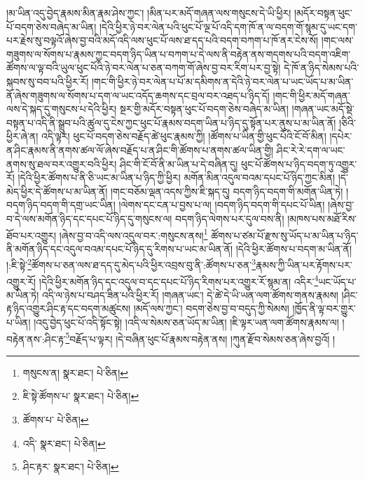 །མ་ཡིན་འདུ་བྱེད་རྣམས་མིན་རྣམ་ཤེས་ཀྱང་། །མིན་པར་མདོ་གཞན་ལས་གསུངས་དེ་ཡི་ཕྱིར། །མདོར་བསྟན་ཕུང་པོ་བདག་ཅེས་བཞེད་མ་ཡིན། །དེའི་ཕྱིར་ཉེ་བར་ལེན་པའི་ཕུང་པོ་ལྔ་པོ་འདི་དག་ཁོ་ན་ལ་བདག་གོ་སྙམ་དུ་ཡང་དག་པར་རྗེས་སུ་བལྟའོ་ཞེས་བྱ་བའི་མདོ་འདི་ལས་ཕུང་པོ་ལས་ཐ་དད་པའི་བདག་བཀག་པ་ཁོ་ནར་ངེས་སོ། །གང་ལས་གཟུགས་ལ་སོགས་པ་རྣམས་ཀྱང་བདག་ཉིད་ཡིན་པ་བཀག་པ་དེ་ལས་ནི་བརྟེན་ནས་གདགས་པའི་བདག་འཇིག་ཚོགས་ལ་ལྟ་བའི་ཡུལ་ཕུང་པོའི་ཉེ་བར་ལེན་པ་ཅན་བཀག་གོ་ཞེས་བྱ་བར་རིག་པར་བྱ་སྟེ། དེ་ཁོ་ན་ཉིད་སེམས་པའི་སྐབས་སུ་བབ་པའི་ཕྱིར་རོ། །གང་གི་ཕྱིར་ཉེ་བར་ལེན་པ་པོ་མ་དམིགས་ན་དེའི་ཉེ་བར་ལེན་པ་ཡང་ཡོད་པ་མ་ཡིན་ནོ་ཞེས་གཟུགས་ལ་སོགས་པ་དག་ལ་ཡང་འདོད་ཆགས་དང་བྲལ་བར་འཐད་པ་ཉིད་དོ། །གང་གི་ཕྱིར་མདོ་གཞན་ལས་དེ་སྐད་དུ་གསུངས་པ་དེའི་ཕྱིར། སྔར་གྱི་མདོར་བསྟན་ཕུང་པོ་བདག་ཅེས་བཞེད་མ་ཡིན། །གཞན་ཡང་མདོ་སྡེ་བསྟན་པ་འདི་ནི་སྒྲུབ་པའི་ཚུལ་དུ་ངེས་ཀྱང་ཕུང་པོ་རྣམས་བདག་ཡིན་པ་ཉིད་དུ་སྟོན་པར་ནུས་པ་མ་ཡིན་ནོ། །ཅིའི་ཕྱིར་ཞེ་ན། འདི་ལྟར། ཕུང་པོ་བདག་ཅེས་བརྗོད་ཚེ་ཕུང་རྣམས་ཀྱི། །ཚོགས་པ་ཡིན་གྱི་ཕུང་པོའི་ངོ་བོ་མིན། །དཔེར་ན་ཤིང་རྣམས་ནི་ནགས་ཚལ་ལོ་ཞེས་བརྗོད་པ་ན་ཤིང་གི་ཚོགས་པ་ནགས་ཚལ་ཡིན་གྱི། ཤིང་རེ་རེ་དག་ལ་ཡང་ནགས་སུ་ཐལ་བར་འགྱུར་བའི་ཕྱིར། ཤིང་གི་ངོ་བོ་ནི་མ་ཡིན་པ་དེ་བཞིན་དུ། ཕུང་པོ་ཚོགས་པ་ཉིད་བདག་ཏུ་འགྱུར་རོ། །དེའི་ཕྱིར་ཚོགས་པ་ནི་ཅི་ཡང་མ་ཡིན་པ་ཉིད་ཀྱི་ཕྱིར། མགོན་མིན་འདུལ་བའམ་དཔང་པོ་ཉིད་ཀྱང་མིན། །དེ་མེད་ཕྱིར་དེ་ཚོགས་པ་མ་ཡིན་ནོ། །གང་བཅོམ་ལྡན་འདས་ཀྱིས་ཇི་སྐད་དུ། བདག་ཉིད་བདག་གི་མགོན་ཡིན་ཏེ། །བདག་ཉིད་བདག་གི་དགྲ་ཡང་ཡིན། །ལེགས་དང་ངན་པ་བྱས་པ་ལ། །བདག་ཉིད་བདག་གི་དཔང་པོ་ཡིན། །ཞེས་བྱ་བ་དེ་ལས་མགོན་ཉིད་དང་དཔང་པོ་ཉིད་དུ་གསུངས་ལ། བདག་ཉིད་ལེགས་པར་དུལ་བས་ནི། །མཁས་པས་མཐོ་རིས་ཐོབ་པར་འགྱུར། །ཞེས་བྱ་བ་འདི་ལས་འདུལ་བར་:གསུངས་ནས།\footnote{གསུངས་ན།  སྣར་ཐང་།  པེ་ཅིན། } ཚོགས་པ་ཙམ་པོ་རྫས་སུ་ཡོད་པ་མ་ཡིན་པ་ཉིད་ནི་མགོན་ཉིད་དང་འདུལ་བའམ་དཔང་པོ་ཉིད་དུ་རིགས་པ་ཡང་མ་ཡིན་ནོ། །དེའི་ཕྱིར་ཚོགས་པ་བདག་མ་ཡིན་ནོ། །:ཇི་སྟེ་\footnote{ཇི་སྟེ་ཚོགས་པ་  སྣར་ཐང་།  པེ་ཅིན། }ཚོགས་པ་ཅན་ལས་ཐ་དད་དུ་མེད་པའི་ཕྱིར་འབྲས་བུ་ནི་:ཚོགས་པ་ཅན་\footnote{ཚོགས་པ་  པེ་ཅིན། }རྣམས་ཀྱི་ཡིན་པར་རྟོགས་པར་འགྱུར་རོ། །དེའི་ཕྱིར་མགོན་ཉིད་དང་འདུལ་བ་དང་དཔང་པོ་ཉིད་རིགས་པར་འགྱུར་རོ་སྙམ་ན། འདིར་\footnote{འདི་  སྣར་ཐང་།  པེ་ཅིན། }ཡང་ཡོད་པ་མ་ཡིན་ཏེ། འདི་ལ་ཉེས་པ་བཤད་ཟིན་པའི་ཕྱིར་རོ། །གཞན་ཡང་། དེ་ཚེ་དེ་ཡི་ཡན་ལག་ཚོགས་གནས་རྣམས། །ཤིང་རྟ་ཉིད་འགྱུར་ཤིང་རྟ་དང་བདག་མཚུངས། །མདོ་ལས་ཀྱང་། བདག་ཅེས་བྱ་བ་བདུད་ཀྱི་སེམས། །ཁྱོད་ནི་ལྟ་བར་གྱུར་པ་ཡིན། །འདུ་བྱེད་ཕུང་པོ་འདི་སྟོང་སྟེ། །འདི་ལ་སེམས་ཅན་ཡོད་མ་ཡིན། །ཇི་ལྟར་ཡན་ལག་ཚོགས་རྣམས་ལ། །བརྟེན་ནས་:ཤིང་རྟ་\footnote{ཤིང་རྟར་  སྣར་ཐང་།  པེ་ཅིན། }བརྗོད་པ་ལྟར། །དེ་བཞིན་ཕུང་པོ་རྣམས་བརྟེན་ནས། །ཀུན་རྫོབ་སེམས་ཅན་ཞེས་བྱའོ། །
